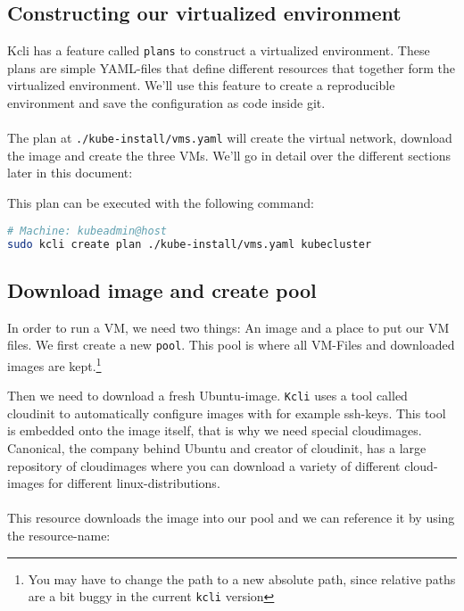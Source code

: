 \subsection{Constructing our virtualized environment}
Kcli has a feature called \texttt{plans} to construct a virtualized environment. These plans are simple YAML-files that define different resources that together form the virtualized environment.
We'll use this feature to create a reproducible environment and save the configuration as code inside git.\\\\
The plan at \texttt{./kube-install/vms.yaml} will create the virtual network, download the image and create the three VMs. We'll go in detail over the different sections later in this document:

This plan can be executed with the following command:
\begin{lstlisting}[language=bash,caption=Deploy virtualized environment using \texttt{kcli}]
# Machine: kubeadmin@host
sudo kcli create plan ./kube-install/vms.yaml kubecluster
\end{lstlisting}

\clearpage
\subsection{Download image and create pool}
In order to run a VM, we need two things: An image and a place to put our VM files. 
We first create a new \texttt{pool}. This pool is where all VM-Files and downloaded images are kept.\footnote{You may have to change the path to a new absolute path, since relative paths are a bit buggy in the current \texttt{kcli} version}

Then we need to download a fresh Ubuntu-image. \texttt{Kcli} uses a tool called cloudinit to automatically configure images with for example ssh-keys. This tool is embedded onto the image itself, that is why we need special cloudimages. Canonical, the company behind Ubuntu and creator of cloudinit, has a large repository of cloudimages where you can download a variety of different cloud-images for different linux-distributions. \cite{CloudInit:2022}\\\\
This resource downloads the image into our pool and we can reference it by using the resource-name:


